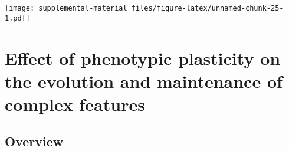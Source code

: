 \documentclass[]{book}
\begin{document}
\texttt{[image: supplemental-material\_files/figure-latex/unnamed-chunk-25-1.pdf]}

\hypertarget{effect-of-phenotypic-plasticity-on-the-evolution-and-maintenance-of-complex-features}{%
\chapter{Effect of phenotypic plasticity on the evolution and maintenance of complex features}\label{effect-of-phenotypic-plasticity-on-the-evolution-and-maintenance-of-complex-features}}

\hypertarget{overview-2}{%
\section{Overview}\label{overview-2}}
\end{document}
